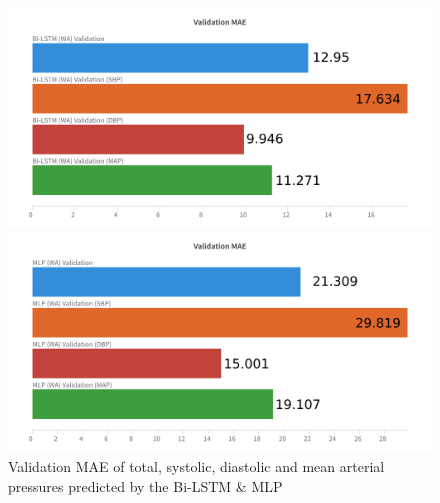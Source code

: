 \begin{figure}[h]
    \centering
    \hspace{-1cm}
    \begin{minipage}{0.5\textwidth}
        \centering
        \includegraphics[width=\linewidth]{images/results/all_mae_bi_lstm}
    \end{minipage}
    \begin{minipage}{0.5\textwidth}
        \centering
        \includegraphics[width=\linewidth]{images/results/all_mae_mlp}
    \end{minipage}
    \captionsetup{format=plain, justification=centering, font=small}
    \caption{Validation MAE of total, systolic, diastolic and mean arterial pressures predicted by the Bi-LSTM \& MLP}
    \label{fig:all_mae}
\end{figure}
